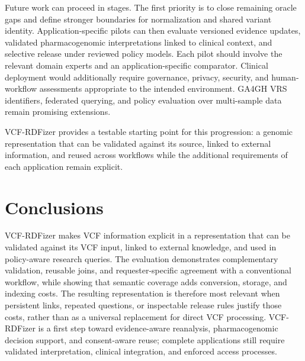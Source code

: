 \documentclass[pdflatex,sn-mathphys-num,referee]{sn-jnl}
\begin{document}
Future work can proceed in stages.
The first priority is to close remaining oracle gaps and define stronger boundaries for normalization and shared variant identity.
Application-specific pilots can then evaluate versioned evidence updates, validated pharmacogenomic interpretations linked to clinical context, and selective release under reviewed policy models.
Each pilot should involve the relevant domain experts and an application-specific comparator.
Clinical deployment would additionally require governance, privacy, security, and human-workflow assessments appropriate to the intended environment.
GA4GH VRS identifiers, federated querying, and policy evaluation over multi-sample data remain promising extensions.

VCF-RDFizer provides a testable starting point for this progression: a genomic representation that can be validated against its source, linked to external information, and reused across workflows while the additional requirements of each application remain explicit.

\section{Conclusions}\label{sec:conclusions}
VCF-RDFizer makes VCF information explicit in a representation that can be validated against its VCF input, linked to external knowledge, and used in policy-aware research queries.
The evaluation demonstrates complementary validation, reusable joins, and requester-specific agreement with a conventional workflow, while showing that semantic coverage adds conversion, storage, and indexing costs.
The resulting representation is therefore most relevant when persistent links, repeated questions, or inspectable release rules justify those costs, rather than as a universal replacement for direct VCF processing.
VCF-RDFizer is a first step toward evidence-aware reanalysis, pharmacogenomic decision support, and consent-aware reuse; complete applications still require validated interpretation, clinical integration, and enforced access processes.
\end{document}
